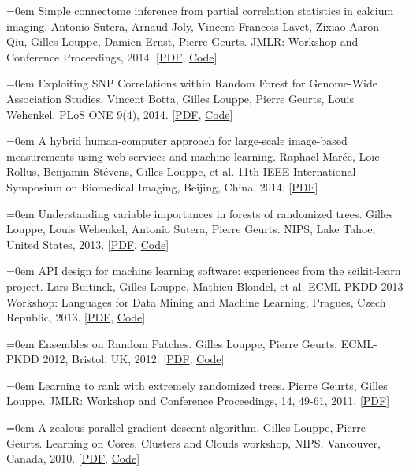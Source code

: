 \documentclass{scrartcl}
\newcommand{\MarginText}[1]{\marginpar{\raggedleft\itshape\small#1}}
\newcommand{\NewPublication}[4]{\noindent\hangindent=0em\hangafter=0 \MarginText{\color{black} #1}{\footnotesize [{\color{Maroon}#2}]} #3 {\footnotesize\color{gray}#4}\vspace{0.5em}}
\begin{document}
\begin{cv}{}
\NewPublication{}{9}{Simple connectome inference from partial correlation statistics in calcium imaging.}{%
Antonio Sutera, Arnaud Joly, Vincent Francois-Lavet, Zixiao Aaron Qiu, Gilles Louppe, Damien Ernst, Pierre Geurts.
JMLR: Workshop and Conference Proceedings, 2014.
[\href{http://hdl.handle.net/2268/169767}{PDF}, \href{https://github.com/glouppe/kaggle-connectomics}{Code}]}

\NewPublication{}{8}{Exploiting SNP Correlations within Random Forest for Genome-Wide Association Studies.}{%
Vincent Botta, Gilles Louppe, Pierre Geurts, Louis Wehenkel.
PLoS ONE 9(4), 2014.
[\href{http://dx.plos.org/10.1371/journal.pone.0093379}{PDF}, \href{https://github.com/0asa/TTree-source}{Code}]}

\NewPublication{}{7}{A hybrid human-computer approach for large-scale image-based measurements using web services and machine learning.}{%
Rapha\"el Mar{\'e}e, Lo\"ic Rollus, Benjamin St\'evens, Gilles Louppe, et al.
11th IEEE International Symposium on Biomedical Imaging, Beijing, China, 2014.
[\href{http://hdl.handle.net/2268/162084}{PDF}]}

\NewPublication{2013}{6}{Understanding variable importances in forests of randomized trees.}{%
Gilles Louppe, Louis Wehenkel, Antonio Sutera, Pierre Geurts.
NIPS, Lake Tahoe, United States, 2013.
[\href{http://hdl.handle.net/2268/155642}{PDF}, \href{http://github.com/glouppe/paper-variable-importances}{Code}]}

\NewPublication{}{5}{API design for machine learning software: experiences from the scikit-learn project.}{%
Lars Buitinck, Gilles Louppe, Mathieu Blondel, et al.
ECML-PKDD 2013 Workshop: Languages for Data Mining and Machine Learning, Pragues, Czech Republic, 2013.
[\href{http://hdl.handle.net/2268/154357}{PDF}, \href{http://github.com/scikit-learn/scikit-learn}{Code}]}

\NewPublication{2012}{4}{Ensembles on Random Patches.}{%
Gilles Louppe, Pierre Geurts.
ECML-PKDD 2012, Bristol, UK, 2012.
[\href{http://hdl.handle.net/2268/130099}{PDF}, \href{http://github.com/scikit-learn/scikit-learn/blob/master/sklearn/ensemble/bagging.py}{Code}]}

\NewPublication{2011}{3}{Learning to rank with extremely randomized trees.}{%
Pierre Geurts, Gilles Louppe.
JMLR: Workshop and Conference Proceedings, 14, 49-61, 2011.
[\href{http://hdl.handle.net/2268/84538}{PDF}]}

\NewPublication{2010}{2}{A zealous parallel gradient descent algorithm.}{%
Gilles Louppe, Pierre Geurts.
Learning on Cores, Clusters and Clouds workshop, NIPS, Vancouver, Canada, 2010.
[\href{http://hdl.handle.net/2268/80780}{PDF}, \href{http://hdl.handle.net/2268/80780}{Code}]}


\end{cv}
\end{document}
